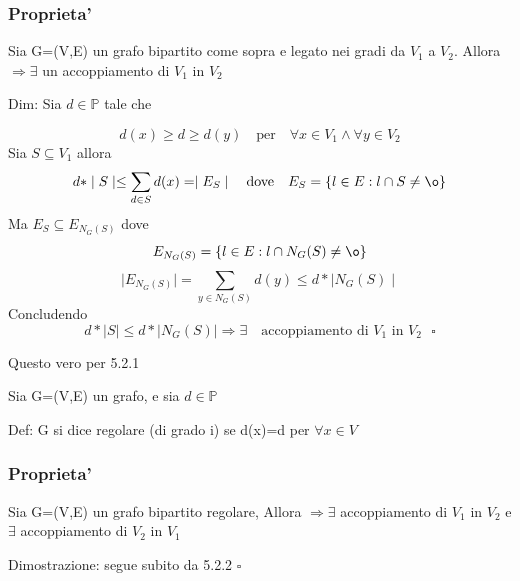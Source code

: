 \documentclass{article}
\begin{document}
        \subsubsection{Proprieta'}
        \begin{flushleft}
          Sia G=(V,E) un grafo bipartito come sopra e legato nei gradi da $V_1$ a $V_2$. Allora $\Rightarrow \exists$ un accoppiamento di $V_1$ in $V_2$
        \end{flushleft}
        \begin{flushleft}
          Dim: Sia $d\in \mathbb{P}$ tale che
        \end{flushleft}
        \begin{equation*}
          d(x) \geq d \geq d(y) \quad \text{per} \quad \forall x \in V_1 \land \forall y \in V_2
        \end{equation*}
        Sia $S \subseteq V_1$ allora
        \begin{equation*}
          d*\mid S\mid \leq \sum_{d\in S} d(x)=\mid E_S \mid \quad \text{dove} \quad E_S=\{l\in E:l\cap S\neq \o\}
        \end{equation*}
        Ma $E_S \subseteq E_{N_G(S)}$ dove
        \begin{equation*}
          E_{N_G(S)}=\{l \in E: l\cap N_G(S)\neq \o\}
        \end{equation*}
        \begin{equation*}
          \mid E_{N_G(S)} \mid = \sum_{y\in N_G(S)} d(y) \leq d* \mid N_G(S) \mid
        \end{equation*}
        Concludendo
        \begin{equation*}
          d*\mid S \mid \leq d*\mid N_G(S) \mid \Rightarrow \exists \quad \text{accoppiamento di $V_1$ in $V_2$ $\square$}
        \end{equation*}
        \begin{flushleft}
          Questo vero per 5.2.1
        \end{flushleft}
        \begin{flushleft}
          Sia G=(V,E) un grafo, e sia $d\in \mathbb{P}$
        \end{flushleft}
        \begin{flushleft}
          Def: G si dice regolare (di grado i) se d(x)=d per $\forall x\in V$
        \end{flushleft}
        \subsubsection{Proprieta'}
        \begin{flushleft}
          Sia G=(V,E) un grafo bipartito regolare, Allora $\Rightarrow \exists$ accoppiamento di $V_1$ in $V_2$ e $\exists$ accoppiamento di $V_2$ in $V_1$
        \end{flushleft}
        \begin{flushleft}
          Dimostrazione: segue subito da 5.2.2 $\square$
        \end{flushleft}
\end{document}
